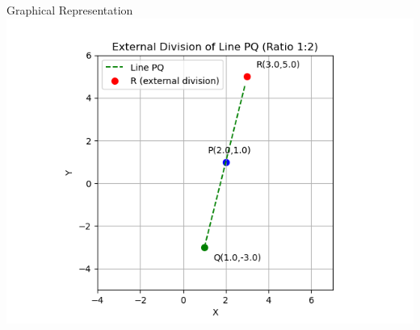 \documentclass{beamer}
\begin{document}
\begin{frame}{Graphical Representation}
    \centering
    \includegraphics[width=0.8\linewidth, keepaspectratio]{figs/section_graph.png}
    \captionsetup{justification=centering}
\end{frame}
\end{document}
